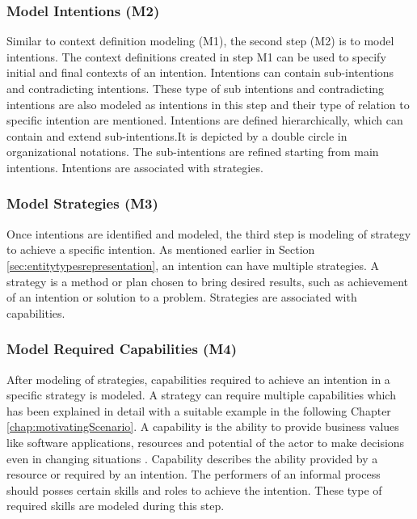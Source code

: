\subsubsection{Model Intentions (M2)}  
 Similar to context definition modeling (M1), the second step (M2) is to model intentions. The context definitions created in step M1 can be used to specify initial and final contexts of an intention. Intentions can contain sub-intentions and contradicting intentions. These type of sub intentions and contradicting intentions are also modeled as intentions in this step and their type of relation to specific intention are mentioned. Intentions are defined hierarchically, which can contain and extend sub-intentions.It is depicted by a double circle in organizational notations. The sub-intentions are refined starting from main intentions. Intentions are associated with strategies.

\subsubsection{Model Strategies (M3)}  
 Once intentions are identified and modeled, the third step is modeling of strategy to achieve a specific intention. As mentioned earlier in Section \ref{sec:entitytypesrepresentation}, an intention can have multiple strategies.  A  strategy is a method or plan chosen to bring  desired results, such as achievement of an intention or solution to a problem. Strategies are associated with capabilities. 

\subsubsection{Model Required Capabilities (M4)}  
 After modeling of strategies, capabilities required to achieve an intention in a specific strategy is modeled. A strategy can require multiple capabilities which has been explained in detail with a suitable example in the following Chapter \ref{chap:motivatingScenario}. 
 A capability is the ability to provide business values like software applications, resources and potential of the actor to make decisions even in changing situations \cite{Stirna2012}. Capability describes the ability provided by a resource or required by an intention. The performers of an informal process should posses certain skills and roles to achieve the intention. These type of required skills are modeled during this step.

